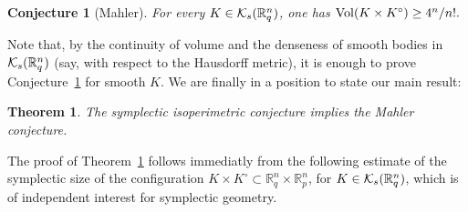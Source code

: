 \documentclass[11pt]{article}
\newtheorem{theorem}[lemma]{Theorem}
\newtheorem{conj}[lemma]{Conjecture}
\begin{document}
\begin{conj}[Mahler]\label{conj:mahler}
For every $K \in {\cal K}_s({\mathbb R}_q^n)$, one has ${\rm Vol}(K \times K^{\circ}) \geq
{{4^n}/ {n!}}.$
\end{conj}
Note that, by the continuity of volume and the denseness of smooth bodies in ${\cal K}_s({\mathbb R}_q^n)$ (say, with respect to  the Hausdorff metric), it is enough to prove Conjecture~\ref{conj:mahler} for smooth $K$.
We are finally in a position to state our main result:
\begin{theorem} \label{main-thm}
The symplectic isoperimetric conjecture implies the Mahler conjecture.
\end{theorem}
The proof of Theorem~\ref{main-thm} follows immediatly from the following estimate of the symplectic size 
of the configuration $K \times K^{\circ} \subset {\mathbb R}^n_q \times {\mathbb R}^n_p$, for $K \in {\cal K}_s({\mathbb R}_q^{n})$, which is of independent interest for symplectic geometry.
\end{document}
